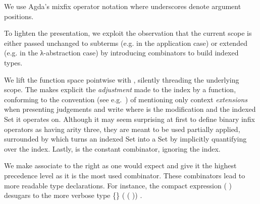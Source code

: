 \begin{center}
\end{center}

We use Agda's mixfix operator notation where underscores denote
argument positions.

To lighten the presentation, we exploit the observation that the
current scope is either passed unchanged to subterms (e.g. in the application case)
or extended (e.g. in the λ-abstraction case) by introducing combinators
to build indexed types.

\begin{center}
\begin{minipage}{0.4\textwidth}
\end{minipage}\hfill
\begin{minipage}{0.5\textwidth}
\end{minipage}
\newline
\begin{minipage}{0.4\textwidth}
\end{minipage}\hfill
\begin{minipage}{0.5\textwidth}
\end{minipage}
\end{center}

We lift the function space pointwise with , silently threading the
underlying scope. The  makes explicit the \emph{adjustment} made to the index
by a function, conforming to the convention (see e.g.~\cite{martin1982constructive}) of mentioning only
context \emph{extensions} when presenting judgements
and write    where  is the modification and  the indexed
Set it operates on. Although it may seem surprising at first to define binary
infix operators as having arity three, they are meant to be used partially applied,
surrounded by  which turns an indexed Set into a Set by implicitly
quantifying over the index.
Lastly,  is the constant combinator, ignoring the index.

We make  associate to the right as one would expect and give it the
highest precedence level as it is the most used combinator. These combinators
lead to more readable type declarations.  For instance, the compact expression
\AF{∀[}   (   )   \AF{]}
desugars to the more verbose type
 \{\}  (   ( ))   .

